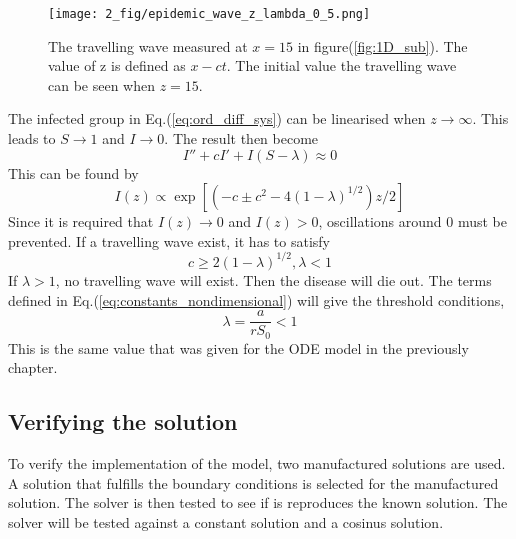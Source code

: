 \documentclass[%
twoside,                 %
final,                   %
chapterprefix=true,      %
open=right               %
10pt]{book}
\begin{document}
\begin{figure}[ht]
  \centerline{\texttt{[image: 2\_fig/epidemic\_wave\_z\_lambda\_0\_5.png]}}
  \caption{
  \label{fig:1D_tw} The travelling wave measured at $x=15$ in figure(\ref{fig:1D_sub}). The value of z is defined as $x-ct$. The initial value the travelling wave can be seen when $z=15$.
  }
\end{figure}




\vspace{3mm}


The infected group in Eq.(\ref{eq:ord_diff_sys}) can be linearised when $z\rightarrow \infty$. This leads to $S\rightarrow 1$ and $I \rightarrow 0$. The result then become 
\begin{equation}
	I'' + cI' + I(S-\lambda) \approx 0 
\end{equation}
This can be found by
\begin{equation}
I(z) \propto \exp\left[(-c \pm {c^2 -4(1-\lambda)}^{1/2})z/2\right]
\end{equation}
Since it is required that $I(z)\rightarrow 0$ and $I(z) > 0$, oscillations around 0 must be prevented. If a travelling wave exist, it has to satisfy
\begin{equation}
	c \geq 2(1-\lambda)^{1/2}, \lambda < 1
\end{equation}
If $\lambda > 1$, no travelling wave will exist. Then the disease will die out. The terms defined in Eq.(\ref{eq:constants_nondimensional}) will give the threshold conditions,
\begin{equation}
	\lambda = \frac{a}{rS_0} < 1
\end{equation}
This is the same value that was given for the ODE model in the previously chapter.
\subsection{Verifying the solution}
To verify the implementation of the model, two manufactured solutions are used. A solution that fulfills the boundary conditions is selected for the manufactured solution. The solver is then tested to see if is reproduces the known solution. The solver will be tested against a constant solution and a cosinus solution. 
\end{document}
